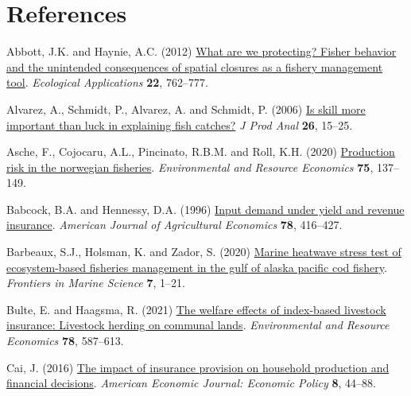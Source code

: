 \documentclass[
  letterpaper,
  DIV=11,
  numbers=noendperiod]{scrartcl}
\newlength{\cslhangindent}
\newlength{\cslentryspacingunit} %
\newenvironment{CSLReferences}[2] %
 {%
  \setlength{\parindent}{0pt}
  \ifodd #1
  \let\oldpar\par
  \def\par{\hangindent=\cslhangindent\oldpar}
  \fi
  \setlength{\parskip}{#2\cslentryspacingunit}
 }%
 {}
\theoremstyle{plain}
\theoremstyle{plain}
\theoremstyle{remark}
\begin{document}
\hypertarget{references}{%
\section*{References}\label{references}}

\hypertarget{refs}{}
\begin{CSLReferences}{1}{0}
\leavevmode{}%
Abbott, J.K. and Haynie, A.C. (2012)
\href{https://doi.org/10.1890/11-1319.1}{What are we protecting? Fisher
behavior and the unintended consequences of spatial closures as a
fishery management tool}. \emph{Ecological Applications} \textbf{22},
762--777.

\leavevmode{}%
Alvarez, A., Schmidt, P., Alvarez, A. and Schmidt, P. (2006)
\href{https://doi.org/10.1007/s11123-006-0002-x}{Is skill more important
than luck in explaining fish catches?} \emph{J Prod Anal} \textbf{26},
15--25.

\leavevmode{}%
Asche, F., Cojocaru, A.L., Pincinato, R.B.M. and Roll, K.H. (2020)
\href{https://doi.org/10.1007/s10640-019-00391-2}{Production risk in the
norwegian fisheries}. \emph{Environmental and Resource Economics}
\textbf{75}, 137--149.

\leavevmode{}%
Babcock, B.A. and Hennessy, D.A. (1996)
\href{https://doi.org/10.2307/1243713}{Input demand under yield and
revenue insurance}. \emph{American Journal of Agricultural Economics}
\textbf{78}, 416--427.

\leavevmode{}%
Barbeaux, S.J., Holsman, K. and Zador, S. (2020)
\href{https://doi.org/10.3389/fmars.2020.00703}{Marine heatwave stress
test of ecosystem-based fisheries management in the gulf of alaska
pacific cod fishery}. \emph{Frontiers in Marine Science} \textbf{7},
1--21.

\leavevmode{}%
Bulte, E. and Haagsma, R. (2021)
\href{https://doi.org/10.1007/s10640-021-00545-1}{The welfare effects of
index-based livestock insurance: Livestock herding on communal lands}.
\emph{Environmental and Resource Economics} \textbf{78}, 587--613.

\leavevmode{}%
Cai, J. (2016) \href{https://doi.org/10.1257/pol.20130371}{The impact of
insurance provision on household production and financial decisions}.
\emph{American Economic Journal: Economic Policy} \textbf{8}, 44--88.


\end{CSLReferences}
\end{document}
